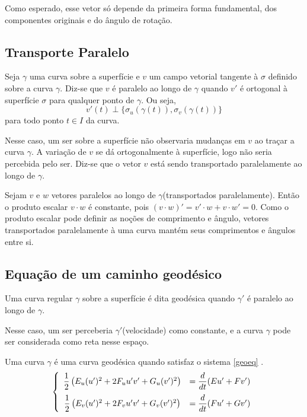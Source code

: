 Como esperado, esse vetor só depende da primeira forma fundamental,
dos componentes originais e do ângulo de rotação.

\subsection{Transporte Paralelo}
\begin{defSurfParallel}
Seja $\gamma$ uma curva sobre a superfície e $v$ um campo vetorial tangente à $\sigma$ definido sobre a curva $\gamma$.
Diz-se que $v$ é paralelo ao longo de $\gamma$ quando $v'$ é ortogonal à superfície $\sigma$
para qualquer ponto de $\gamma$. Ou seja,
\[v'(t) \perp \{\sigma_u(\gamma(t)), \sigma_v(\gamma(t))\}\]
para todo ponto $t \in I$ da curva.
\end{defSurfParallel}

Nesse caso, um ser sobre a superfície não observaria mudanças em $v$ ao traçar a curva $\gamma$.
A variação de $v$ se dá ortogonalmente à superfície, logo não seria percebida pelo ser.
Diz-se que o vetor $v$ está sendo transportado paralelamente ao longo de $\gamma$.

Sejam $v$ e $w$ vetores paralelos ao longo de $\gamma$(transportados paralelamente).
Então o produto escalar $v \cdot w$ é constante, pois $(v \cdot w)' = v' \cdot w + v \cdot w' = 0$.
Como o produto escalar pode definir as noções de comprimento e ângulo, vetores transportados
paralelamente à uma curva mantém seus comprimentos e ângulos entre si.

\subsection{Equação de um caminho geodésico}
\begin{defSurfGeodesic}
Uma curva regular $\gamma$ sobre a superfície é dita geodésica quando
$\gamma'$ é paralelo ao longo de $\gamma$.
\end{defSurfGeodesic}

Nesse caso, um ser perceberia $\gamma'$(velocidade) como constante, e a curva $\gamma$ pode
ser considerada como reta nesse espaço.

Uma curva $\gamma$ é uma curva geodésica quando satisfaz o sistema \ref{geoeq} \cite{GeomDiff:1}.
\begin{equation}
\label{geoeq}
    \left\{\begin{array}{cc}
        \dfrac{1}{2}\left(E_u(u')^2 + 2F_uu'v' + G_u(v')^2\right) & = \dfrac{d}{dt}(Eu' + Fv') \vspace{6pt}\\
        \dfrac{1}{2}\left(E_v(u')^2 + 2F_vu'v' + G_v(v')^2\right) & = \dfrac{d}{dt}(Fu' + Gv')
    \end{array}\right.
\end{equation}

